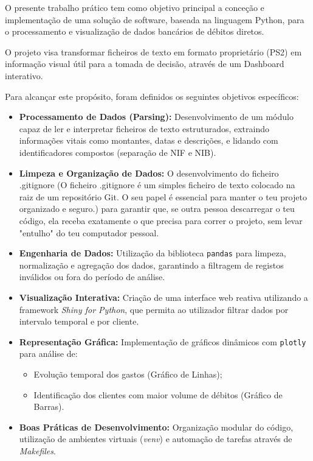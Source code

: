 O presente trabalho prático tem como objetivo principal a conceção e implementação de uma solução de software, baseada na linguagem Python, para o processamento e visualização de dados bancários de débitos diretos.

\vspace*{0.5cm}

O projeto visa transformar ficheiros de texto em formato proprietário (PS2) em informação visual útil para a tomada de decisão, através de um Dashboard interativo.

\vspace*{0.5cm}

Para alcançar este propósito, foram definidos os seguintes objetivos específicos:

\begin{itemize}
    \item \textbf{Processamento de Dados (Parsing):} Desenvolvimento de um módulo capaz de ler e interpretar ficheiros de texto estruturados, extraindo informações vitais como montantes, datas e descrições, e lidando com identificadores compostos (separação de NIF e NIB).

    \item \textbf{Limpeza e Organização de Dados:} O desenvolvimento do ficheiro .gitignore (O ficheiro .gitignore é um simples ficheiro de texto colocado na raiz de um repositório Git. O seu papel é essencial para manter o teu projeto organizado e seguro.)  para garantir que, se outra pessoa descarregar o teu código, ela receba exatamente o que precisa para correr o projeto, sem levar "entulho" do teu computador pessoal.
    
    \item \textbf{Engenharia de Dados:} Utilização da biblioteca \texttt{pandas} para limpeza, normalização e agregação dos dados, garantindo a filtragem de registos inválidos ou fora do período de análise.

    \item \textbf{Visualização Interativa:} Criação de uma interface web reativa utilizando a framework \textit{Shiny for Python}, que permita ao utilizador filtrar dados por intervalo temporal e por cliente.

    \item \textbf{Representação Gráfica:} Implementação de gráficos dinâmicos com \texttt{plotly} para análise de:
    \begin{itemize}
        \item Evolução temporal dos gastos (Gráfico de Linhas);
        \item Identificação dos clientes com maior volume de débitos (Gráfico de Barras).
    \end{itemize}

    \item \textbf{Boas Práticas de Desenvolvimento:} Organização modular do código, utilização de ambientes virtuais (\textit{venv}) e automação de tarefas através de \textit{Makefiles}.
\end{itemize}
